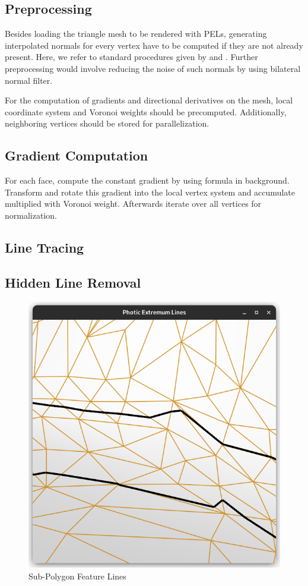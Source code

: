 \documentclass[9pt,fleqn,twoside,twocolumn]{stdglobal}
\begin{document}
  \subsection{Preprocessing}
    Besides loading the triangle mesh to be rendered with PELs, generating interpolated normals for every vertex have to be computed if they are not already present.
    Here, we refer to standard procedures given by \textcite{max1999} and \textcite{jin2005}.
    Further preprocessing would involve reducing the noise of such normals by using bilateral normal filter.

    For the computation of gradients and directional derivatives on the mesh, local coordinate system and Voronoi weights should be precomputed.
    Additionally, neighboring vertices should be stored for parallelization.

  \subsection{Gradient Computation}
    For each face, compute the constant gradient by using formula in background.
    Transform and rotate this gradient into the local vertex system and accumulate multiplied with Voronoi weight.
    Afterwards iterate over all vertices for normalization.

  \subsection{Line Tracing}
  \subsection{Hidden Line Removal}

  \begin{figure}
    \centering
    \includegraphics[width=\linewidth,trim={15px 15 15 50},clip]{images/subpolygon-lines.png}
    \caption{Sub-Polygon Feature Lines}
  \end{figure}
\end{document}
